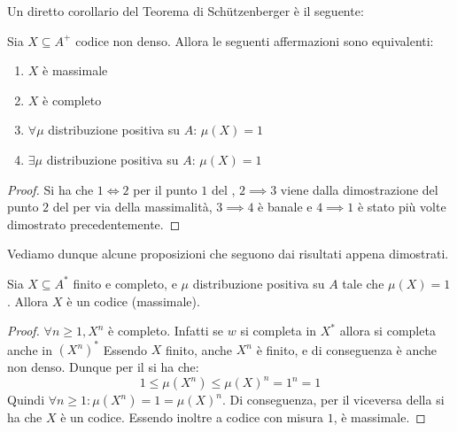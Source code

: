 Un diretto corollario del Teorema di Schützenberger è il seguente:
\begin{corollary}[label=cor:schutz_maximality_completeness]{}
  Sia \(X \subseteq A^+\) codice non denso. Allora le seguenti affermazioni sono equivalenti:
  \begin{enumerate}
    \item \(X\) è massimale
    \item \(X\) è completo
    \item \(\forall \mu\) distribuzione positiva su \(A\): \(\mu(X) = 1\)
    \item \(\exists \mu\) distribuzione positiva su \(A\): \(\mu(X) = 1\)
  \end{enumerate}
\end{corollary}
\begin{proof}
  Si ha che \(1 \iff 2\) per il punto \(1\) del , \(2 \implies 3\) viene dalla dimostrazione del punto \(2\) del  per via della massimalità, \(3 \implies 4\) è banale e \(4 \implies 1\) è stato più volte dimostrato precedentemente.
\end{proof}

Vediamo dunque alcune proposizioni che seguono dai risultati appena dimostrati.

\begin{proposition}{}
  Sia \(X\subseteq A^*\) finito e completo, e \(\mu\) distribuzione positiva su \(A\) tale che \(\mu(X) = 1\). Allora \(X\) è un codice (massimale).
\end{proposition}

\begin{proof}
  \(\forall n \geq 1, X^n\) è completo. Infatti se \(w\) si completa in \(X^*\) allora si completa anche in \({(X^n)}^*\)
  Essendo \(X\) finito, anche \(X^n\) è finito, e di conseguenza è anche non denso. Dunque per il  si ha che:
  \[1\leq \mu(X^n) \leq {\mu(X)}^n = 1^n = 1\]
  Quindi \(\forall n \geq 1: \mu(X^n) = 1 = {\mu(X)}^n\).
  Di conseguenza, per il viceversa della  si ha che \(X\) è un codice.
  Essendo inoltre a codice con misura \(1\), è massimale.
\end{proof}

